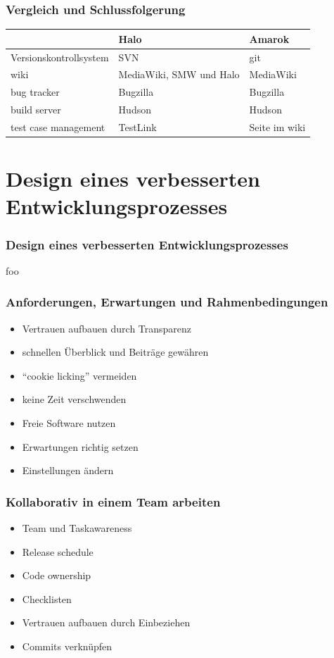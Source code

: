 \documentclass{beamer}
\begin{document}
\begin{frame}
\frametitle{Vergleich und Schlussfolgerung}
\begin{tabularx}{\textwidth}{|X|X|X|}
\hline
 & Halo & Amarok\\
\hline \hline
Versionskontrollsystem & SVN & git\\
\hline
wiki & MediaWiki, SMW und Halo & MediaWiki\\
\hline
bug tracker & Bugzilla & Bugzilla\\
\hline
build server & Hudson & Hudson\\
\hline
test case management & TestLink & Seite im wiki\\
\hline
\end{tabularx}
\end{frame}

\section{Design eines verbesserten Entwicklungsprozesses}

\begin{frame}
\frametitle{Design eines verbesserten Entwicklungsprozesses}
foo
\end{frame}

\begin{frame}
\frametitle{Anforderungen, Erwartungen und Rahmenbedingungen}
\begin{itemize}
 \item Vertrauen aufbauen durch Transparenz
 \item schnellen \"Uberblick und Beitr\"age gew\"ahren
 \item ``cookie licking'' vermeiden
 \item keine Zeit verschwenden
 \item Freie Software nutzen
 \item Erwartungen richtig setzen
 \item Einstellungen \"andern
\end{itemize}
\end{frame}

\begin{frame}
\frametitle{Kollaborativ in einem Team arbeiten}
\begin{itemize}
 \item Team und Taskawareness
 \item Release schedule
 \item Code ownership
 \item Checklisten
 \item Vertrauen aufbauen durch Einbeziehen
 \item Commits verkn\"upfen
\end{itemize}
\end{frame}
\end{document}
